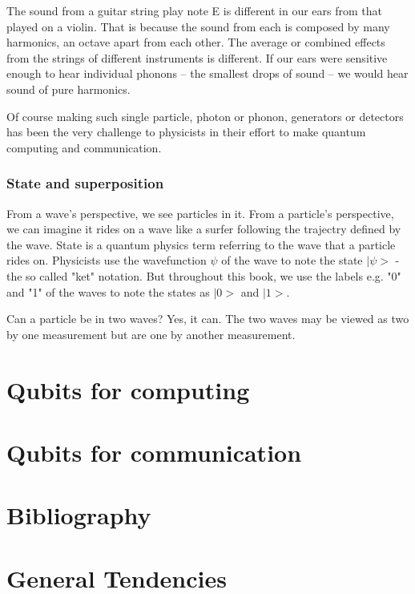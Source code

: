 \documentclass{book}
\begin{document}
The sound from a guitar string play note E is different in our ears from that played on a violin. That is because the sound from each is composed by many harmonics, an octave apart from each other. The average or combined effects from the strings of different instruments is different. If our ears were sensitive enough to hear individual phonons -- the smallest drops of sound -- we would hear sound of pure harmonics.

Of course making such single particle, photon or phonon, generators or detectors has been the very challenge to physicists in their effort to make quantum computing and communication.

\subsection{State and superposition}
From a wave's perspective, we see particles in it. From a particle's perspective, we can imagine it rides on a wave like a surfer following the trajectry defined by the wave. State is a quantum physics term referring to the wave that a particle rides on. Physicists use the wavefunction $\psi$ of the wave to note the state $|\psi>$ - the so called "ket" notation. But throughout this book, we use the labels e.g. "0" and "1" of the waves to note the states as $|0>$ and $|1>$. 

Can a particle be in two waves? Yes, it can. The two waves may be viewed as two by one measurement but are one by another measurement. 

\chapter{Qubits for computing}
\chapter{Qubits for communication}
\chapter{Bibliography}
\chapter{General Tendencies}

\backmatter
{}
\printindex
\end{document}
